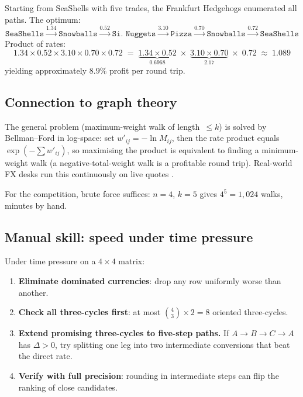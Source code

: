 Starting from SeaShells with five trades, the Frankfurt Hedgehogs
enumerated all paths.  The optimum:
\[
  \texttt{SeaShells}
  \xrightarrow{1.34}
  \texttt{Snowballs}
  \xrightarrow{0.52}
  \texttt{Si.\ Nuggets}
  \xrightarrow{3.10}
  \texttt{Pizza}
  \xrightarrow{0.70}
  \texttt{Snowballs}
  \xrightarrow{0.72}
  \texttt{SeaShells}
\]
Product of rates:
\[
  1.34 \times 0.52 \times 3.10 \times 0.70 \times 0.72
  \;=\;
  \underbrace{1.34 \times 0.52}_{0.6968}
  \;\times\;
  \underbrace{3.10 \times 0.70}_{2.17}
  \;\times\; 0.72
  \;\approx\; 1.089
\]
yielding approximately $8.9\%$ profit per round trip.

\subsection{Connection to graph theory}

The general problem (maximum-weight walk of length~$\le k$) is
solved by Bellman--Ford in log-space: set $w'_{ij} = -\ln M_{ij}$,
then the rate product equals $\exp(-\sum w'_{ij})$, so maximising
the product is equivalent to finding a minimum-weight walk (a
negative-total-weight walk is a profitable round trip).  Real-world
FX desks run this continuously on live quotes \citeBouchaud.

For the competition, brute force suffices: $n = 4$, $k = 5$ gives
$4^5 = 1{,}024$ walks, minutes by hand.

\subsection{Manual skill: speed under time pressure}

Under time pressure on a $4 \times 4$ matrix:
\begin{enumerate}
  \item \textbf{Eliminate dominated currencies}: drop any row
  uniformly worse than another.
  \item \textbf{Check all three-cycles first}: at most
  $\binom{4}{3} \times 2 = 8$ oriented three-cycles.
  \item \textbf{Extend promising three-cycles to five-step paths.}
  If $A \to B \to C \to A$ has $\Delta > 0$, try splitting one
  leg into two intermediate conversions that beat the direct rate.
  \item \textbf{Verify with full precision}: rounding in
  intermediate steps can flip the ranking of close candidates.
\end{enumerate}

